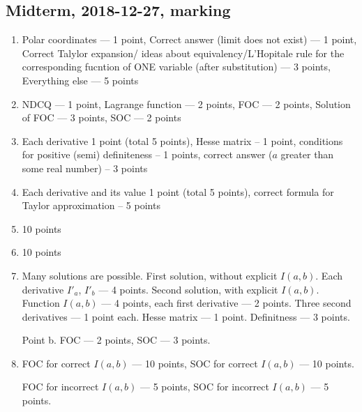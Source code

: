 \subsection{Midterm, 2018-12-27, marking}

\begin{enumerate}
\item Polar coordinates — 1 point, Correct answer (limit does not exist) — 1 point, Correct Talylor expansion/ ideas about equivalency/L'Hopitale rule for the corresponding fucntion of ONE variable (after substitution) — 3 points, Everything else — 5 points
\item
NDCQ — 1 point, Lagrange function — 2 points, FOC — 2 points, Solution of FOC — 3 points, SOC — 2 points

  \item Each derivative 1 point (total 5 points), Hesse matrix – 1
  point, conditions for positive (semi) definiteness – 1 points, correct answer ($a$ greater than some real number) – 3 points
 \item  Each derivative and its value 1 point (total 5 points), correct formula for Taylor approximation – 5
points
  \item 10 points
  \item 10 points
  \item Many solutions are possible. First solution, without explicit $I(a,b)$. Each derivative $I'_a$, $I'_b$ — 4 points. Second solution, with explicit $I(a,b)$. Function $I(a,b)$ — 4 points, each first derivative — 2 points.
  Three second derivatives — 1 point each. Hesse matrix — 1 point. Definitness — 3 points.

  Point b. FOC — 2 points, SOC — 3 points.
  \item FOC for correct $I(a,b)$ — 10 points, SOC for correct $I(a,b)$ — 10 points.

FOC for incorrect $I(a,b)$ — 5 points, SOC for incorrect $I(a,b)$ — 5 points.

\end{enumerate}

